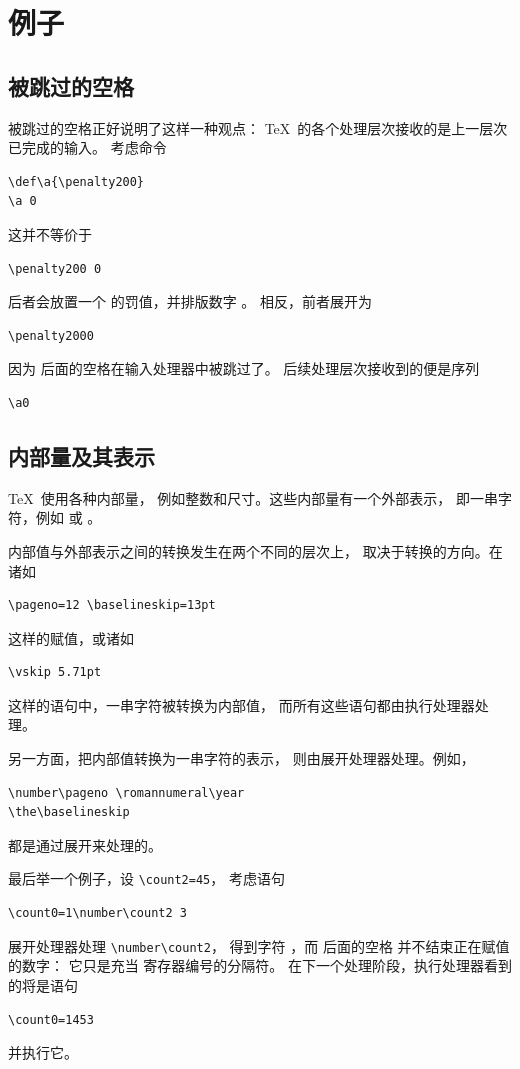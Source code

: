 \documentclass[a4paper]{rapport3}
\begin{document}
\section{例子}

\subsection{被跳过的空格}

被跳过的空格正好说明了这样一种观点：
\TeX\ 的各个处理层次接收的是上一层次已完成的输入。
考虑命令
\begin{verbatim}
\def\a{\penalty200}
\a 0
\end{verbatim}
这{\italic 并不\/}等价于
\begin{verbatim}
\penalty200 0
\end{verbatim}
\awp
后者会放置一个  的罚值，并排版数字 。
相反，前者展开为
\begin{verbatim}
\penalty2000
\end{verbatim}
因为  后面的空格在输入处理器中被跳过了。
后续处理层次接收到的便是序列
\begin{verbatim}
\a0
\end{verbatim}

\subsection{内部量及其表示}

\TeX\ 使用各种内部量，
例如整数和尺寸。这些内部量有一个外部表示，
即一串字符，例如  或 \n{91.44cm}。

内部值与外部表示之间的转换发生在两个不同的层次上，
取决于转换的方向。在诸如
\begin{verbatim}
\pageno=12 \baselineskip=13pt
\end{verbatim}
这样的赋值，或诸如
\begin{verbatim}
\vskip 5.71pt
\end{verbatim}
这样的语句中，一串字符被转换为内部值，
而所有这些语句都由执行处理器处理。

另一方面，把内部值转换为一串字符的表示，
则由展开处理器处理。例如，
\begin{verbatim}
\number\pageno \romannumeral\year
\the\baselineskip
\end{verbatim}
都是通过展开来处理的。

最后举一个例子，设 \verb>\count2=45>，
考虑语句
\begin{verbatim}
\count0=1\number\count2 3
\end{verbatim}
展开处理器处理 \verb>\number\count2>，
得到字符 ，而  后面的空格
并不结束正在赋值的数字：
它只是充当  寄存器编号的分隔符。
在下一个处理阶段，执行处理器看到的将是语句
\begin{verbatim}
\count0=1453
\end{verbatim}
并执行它。
\end{document}
